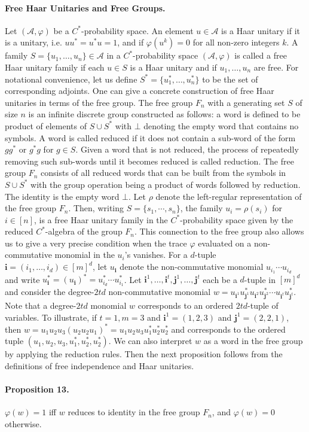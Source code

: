\paragraph{Free Haar Unitaries and Free Groups.}
Let $(\mathcal A,\varphi)$ be a $C^*$-probability space. An element $u\in\mathcal A$ is a Haar unitary if it is a unitary, i.e. $uu^*=u^*u=1$, and if $\varphi(u^k)=0$ for all non-zero integers $k$. A family $S=\{u_1,\ldots,u_n\}\in\mathcal A$ in a $C^*$-probability space $(\mathcal A,\varphi)$ is called a free Haar unitary family if each $u\in S$ is a Haar unitary and if $u_1,\ldots,u_n$ are free. For notational convenience, let us define $S^*=\{u_1^*,\ldots,u_n^*\}$ to be the set of corresponding adjoints.
One can give a concrete construction of free Haar unitaries in terms of the free group. The free group $F_n$ with a generating set $S$ of size $n$ is an infinite discrete group constructed as follows: a word is defined to be product of elements of $S\cup S^*$ with $\bot$ denoting the empty word that contains no symbols. A word is called reduced if it does not contain a sub-word of the form $gg^*$ or $g^*g$ for $g\in S$. Given a word that is not reduced, the process of repeatedly removing such sub-words until it becomes reduced is called reduction. The free group $F_n$ consists of all reduced words that can be built from the symbols in $S\cup S^*$ with the group operation being a product of words followed by reduction. The identity is the empty word $\bot$.
Let $\rho$ denote the left-regular representation of the free group $F_n$. Then, writing $S=\{s_1,\cdots,s_n\}$, the family $u_i=\rho(s_i)$ for $i\in[n]$, is a free Haar unitary family in the $C^*$-probability space given by the reduced $C^*$-algebra of the group $F_n$. This connection to the free group also allows us to give a very precise condition when the trace $\varphi$ evaluated on a non-commutative monomial in the $u_i$'s vanishes. For a $d$-tuple $\mathbf i=(i_1,\ldots,i_d)\in[m]^d$, let $u_{\mathbf i}$ denote the non-commutative monomial $u_{i_1}\cdots u_{i_d}$ and write $u_{\mathbf i}^*=(u_{\mathbf i})^*=u_{i_d}^*\cdots u_{i_1}^*$. Let $\mathbf i^1,\ldots,\mathbf i^t,\mathbf j^1,\ldots,\mathbf j^t$ each be a $d$-tuple in $[m]^d$ and consider the degree-$2td$ non-commutative monomial $w=u_{\mathbf i^1}u_{\mathbf j^1}^*u_{\mathbf i^2}u_{\mathbf j^2}^*\cdots u_{\mathbf i^t}u_{\mathbf j^t}^*$. Note that a degree-$2td$ monomial $w$ corresponds to an ordered $2td$-tuple of variables. To illustrate, if $t=1,m=3$ and $\mathbf i^1=(1,2,3)$ and $\mathbf j^1=(2,2,1)$, then $w=u_1u_2u_3(u_2u_2u_1)^*=u_1u_2u_3u_1^*u_2^*u_2^*$ and corresponds to the ordered tuple $(u_1,u_2,u_3,u_1^*,u_2^*,u_2^*)$. We can also interpret $w$ as a word in the free group by applying the reduction rules. Then the next proposition follows from the definitions of free independence and Haar unitaries.
\paragraph{Proposition 13.}
$\varphi(w)=1$ iff $w$ reduces to identity in the free group $F_n$, and $\varphi(w)=0$ otherwise.
